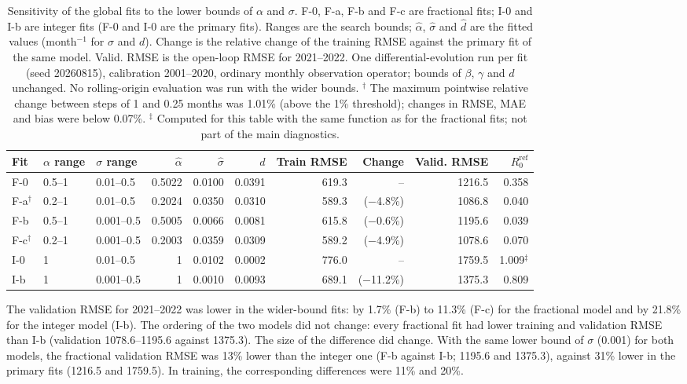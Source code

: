 \documentclass[pdflatex,sn-mathphys-ay,lineno]{sn-jnl}
\begin{document}
\begin{table}[htbp]
\centering
\scriptsize
\caption{Sensitivity of the global fits to the lower bounds of $\alpha$ and $\sigma$. F-0, F-a, F-b and F-c are fractional fits; I-0 and I-b are integer fits (F-0 and I-0 are the primary fits). Ranges are the search bounds; $\hat\alpha$, $\hat\sigma$ and $\hat d$ are the fitted values (month$^{-1}$ for $\sigma$ and $d$). Change is the relative change of the training RMSE against the primary fit of the same model. Valid. RMSE is the open-loop RMSE for 2021--2022. One differential-evolution run per fit (seed 20260815), calibration 2001--2020, ordinary monthly observation operator; bounds of $\beta$, $\gamma$ and $d$ unchanged. No rolling-origin evaluation was run with the wider bounds. $^\dagger$ The maximum pointwise relative change between steps of 1 and 0.25 months was 1.01\% (above the 1\% threshold); changes in RMSE, MAE and bias were below 0.07\%. $^\ddagger$ Computed for this table with the same function as for the fractional fits; not part of the main diagnostics.}
\label{tab:sens}
\begingroup\setlength{\tabcolsep}{2pt}
\begin{tabular}{@{}lllrrrrrrr@{}}
\toprule
Fit & $\alpha$ range & $\sigma$ range & $\hat\alpha$ & $\hat\sigma$ & $\hat d$ & Train RMSE & Change & Valid. RMSE & $R_0^{\mathrm{ref}}$ \\
\midrule
F-0 & 0.5--1 & 0.01--0.5 & 0.5022 & 0.0100 & 0.0391 & 619.3 & -- & 1216.5 & 0.358 \\
F-a$^{\dagger}$ & 0.2--1 & 0.01--0.5 & 0.2024 & 0.0350 & 0.0310 & 589.3 & ($-$4.8\%) & 1086.8 & 0.040 \\
F-b & 0.5--1 & 0.001--0.5 & 0.5005 & 0.0066 & 0.0081 & 615.8 & ($-$0.6\%) & 1195.6 & 0.039 \\
F-c$^{\dagger}$ & 0.2--1 & 0.001--0.5 & 0.2003 & 0.0359 & 0.0309 & 589.2 & ($-$4.9\%) & 1078.6 & 0.070 \\
I-0 & 1 & 0.01--0.5 & 1 & 0.0102 & 0.0002 & 776.0 & -- & 1759.5 & 1.009$^{\ddagger}$ \\
I-b & 1 & 0.001--0.5 & 1 & 0.0010 & 0.0093 & 689.1 & ($-$11.2\%) & 1375.3 & 0.809 \\
\bottomrule
\end{tabular}
\endgroup
\end{table}

The validation RMSE for 2021--2022 was lower in the wider-bound fits: by 1.7\% (F-b) to 11.3\% (F-c) for the fractional model and by 21.8\% for the integer model (I-b). The ordering of the two models did not change: every fractional fit had lower training and validation RMSE than I-b (validation 1078.6--1195.6 against 1375.3). The size of the difference did change. With the same lower bound of $\sigma$ (0.001) for both models, the fractional validation RMSE was 13\% lower than the integer one (F-b against I-b; 1195.6 and 1375.3), against 31\% lower in the primary fits (1216.5 and 1759.5). In training, the corresponding differences were 11\% and 20\%.
\end{document}
